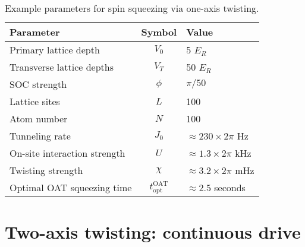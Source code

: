 \documentclass[aps,notitlepage,nofootinbib,11pt]{revtex4-1}
\renewcommand{\t}{\text} %
\newcommand{\1}{\mathds{1}}
\begin{document}
\begin{table}[h]
  \centering
  \caption{Example parameters for spin squeezing via one-axis
    twisting.}
  \label{tab:parameters}
  \begin{tabular}{|l|c|l|}
    \hline
    Parameter & Symbol & Value \\ \hline\hline
    Primary lattice depth & $V_0$ & 5 $E_R$ \\
    Transverse lattice depths & $V_T$ & 50 $E_R$ \\
    SOC strength & $\phi$ & $\pi/50$ \\
    Lattice sites & $L$ & 100 \\
    Atom number & $N$ & 100 \\ \hline\hline
    Tunneling rate & $J_0$ & $\approx230\times2\pi$ Hz \\
    On-site interaction strength & $U$ & $\approx1.3\times2\pi$ kHz \\
    Twisting strength & $\chi$ & $\approx3.2\times2\pi$ mHz \\
    Optimal OAT squeezing time & $t_{\t{opt}}^{\t{OAT}}$
    & $\approx2.5$ seconds \\ \hline
  \end{tabular}
\end{table}


\section{Two-axis twisting: continuous drive}
\label{sec:continuous_drive}
\end{document}

